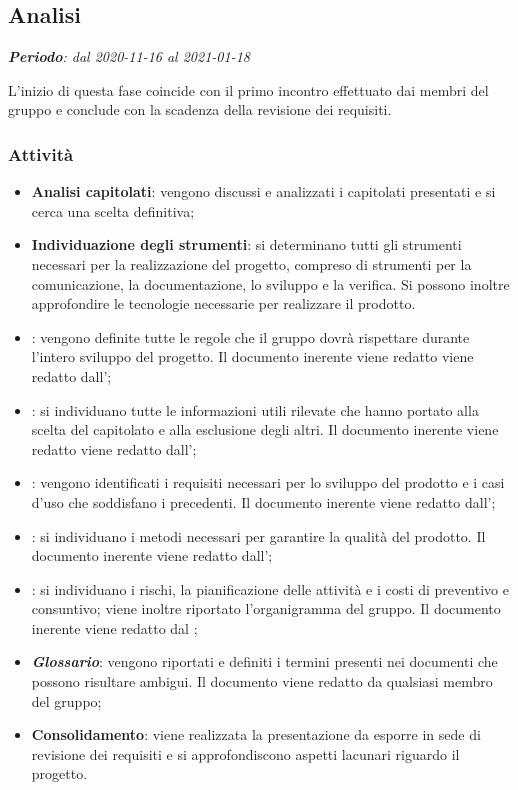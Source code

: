 \subsection{Analisi}

\textit{\textbf{Periodo}: dal 2020-11-16 al 2021-01-18}

L'inizio di questa fase coincide con il primo incontro effettuato dai membri del gruppo e conclude con la scadenza della revisione dei requisiti.

\subsubsection{Attività}

\begin{itemize}
\item \textbf{Analisi capitolati}: vengono discussi e analizzati i capitolati presentati e si cerca una scelta definitiva;
\item \textbf{Individuazione degli strumenti}: si determinano tutti gli strumenti necessari per la realizzazione del progetto, compreso di strumenti per la comunicazione, la documentazione, lo sviluppo e la verifica. Si possono inoltre approfondire le tecnologie necessarie per realizzare il prodotto.
\item \textbf{\NdP{}}: vengono definite tutte le regole che il gruppo dovrà rispettare durante l'intero sviluppo del progetto. Il documento inerente viene redatto viene redatto dall'\ammProg{};
\item \textbf{\SdF{}}: si individuano tutte le informazioni utili rilevate che hanno portato alla scelta del capitolato e alla esclusione degli altri. Il documento inerente viene redatto viene redatto dall'\analProg{};
\item \textbf{\AdR{}}: vengono identificati i requisiti necessari per lo sviluppo del prodotto e i casi d'uso che soddisfano i precedenti. Il documento inerente viene redatto dall'\analProg{};
\item \textbf{\PdQ{}}: si individuano i metodi necessari per garantire la qualità del prodotto. Il documento inerente viene redatto dall'\ammProg{};
\item \textbf{\PdP{}}: si individuano i rischi, la pianificazione delle attività e i costi di preventivo e consuntivo; viene inoltre riportato l'organigramma del gruppo. Il documento inerente viene redatto dal \respProg{};
\item \textbf{\textit{Glossario}}: vengono riportati e definiti i termini presenti nei documenti che possono risultare ambigui. Il documento viene redatto da qualsiasi membro del gruppo;
\item \textbf{Consolidamento}: viene realizzata la presentazione da esporre in sede di revisione dei requisiti e si approfondiscono aspetti lacunari riguardo il progetto.
\end{itemize}

